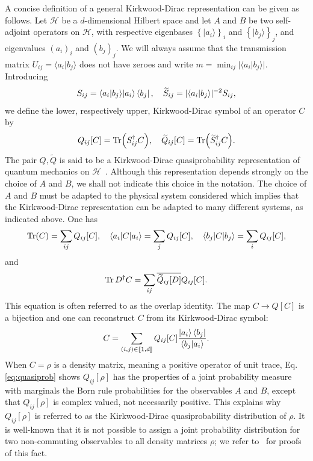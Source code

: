 \documentclass[a4paper, notitlepage, 11pt]{article}
\numberwithin{equation}{section}
\newcommand{\cket}[1]{|#1\rangle}
\newcommand{\bracket}[2]{\langle #1 | #2\rangle}
\newcommand{\mcl}[1]{\ensuremath{\mathcal{#1}}}
\newcommand{\Hcal}{{\mcl H}}
\newcommand{\IntEnt}[2]{\llbracket #1 , #2 \rrbracket}
\begin{document}
A concise definition of a general Kirkwood-Dirac representation can be given as follows.  Let $\Hcal$ be a $d$-dimensional Hilbert space and let $A$ and $B$ be two self-adjoint operators on $\Hcal$, with respective eigenbases $\left\{\cket{a_i}\right\}_{i}$ and  $\left\{\cket{b_j}\right\}_{j}$, and eigenvalues $\left(a_i\right)_{i}$ and $\left(b_j\right)_{j}$. We will always assume that the transmission matrix $U_{ij}=\langle a_i|b_j\rangle$ does not have zeroes and write $m=\min_{ij}|\langle a_i|b_j\rangle|$. Introducing
\begin{equation}\label{eq:frames}
    S_{ij}=\bracket{a_i}{b_j} \cket{a_i}\bra{b_j},\quad \widetilde{S}_{ij}=|\langle a_i|b_j\rangle|^{-2}S_{ij},
\end{equation}
we define the lower, respectively upper, Kirkwood-Dirac symbol of an operator $C$ by 
\begin{equation}
    Q_{ij}[C]= \Tr (S_{ij}^{\dagger} C),\quad \widetilde{Q}_{ij}[C]= \Tr (\widetilde{S}_{ij}^{\dagger} C).
\end{equation}
The pair $Q, \widetilde{Q}$ is said to be a Kirkwood-Dirac quasiprobability representation of quantum mechanics on $\Hcal$~\cite{Fe11}. Although this representation depends strongly on the choice of $A$ and $B$, we shall not indicate this choice in the notation. The choice of $A$ and $B$  must be adapted to the physical system considered which  implies that the Kirkwood-Dirac representation can be adapted to many different systems, as indicated above. One has
\begin{equation}\label{eq:quasiprob}
   \Tr(C)=\sum_{ij} Q_{ij}[C], \quad \langle a_i|C|a_i\rangle=\sum_j Q_{ij}[C],\quad \langle b_j|C|b_j\rangle=\sum_i Q_{ij}[C],
\end{equation}
and
\begin{equation}\label{eq:overlap}
   \Tr D^\dagger C=\sum_{ij} \overline{\widetilde{Q}_{ij}[D]}Q_{ij}[C].
\end{equation}
This equation is often referred to as the overlap identity. The map $C\to Q[C]$ is a bijection and one can reconstruct $C$ from its Kirkwood-Dirac symbol:
\begin{equation}\label{eq:reconstruction}
   C = \sum_{(i,j)\in\IntEnt{1}{d}} Q_{ij}[C]\frac{\cket{a_i}\bra{b_j}}{\bracket{b_j}{a_i}}.
\end{equation}
When $C=\rho$ is  a density matrix, meaning a positive operator of unit trace, Eq.\eqref{eq:quasiprob} shows $Q_{ij}[\rho]$ has the properties of a joint probability measure with marginals the Born rule probabilities for the observables $A$ and $B$, except that $Q_{ij}[\rho]$ is complex valued, not necessarily positive. This explains why $Q_{ij}[\rho]$ is referred to as the Kirkwood-Dirac quasiprobability distribution of $\rho$. It is well-known that it is not possible to assign a joint probability distribution  for two non-commuting observables to all density matrices $\rho$; we refer to~\cite{Fe11,spekkens2008,lostaglio2023kirkwood} for proofs of this fact.
\end{document}
